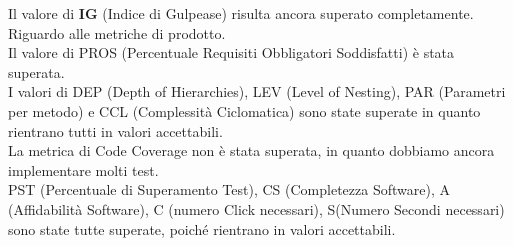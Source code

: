 Il valore di \textbf{IG} (Indice di Gulpease) risulta ancora superato completamente.\\
Riguardo alle metriche di prodotto.\\
Il valore di PROS (Percentuale Requisiti Obbligatori Soddisfatti) è stata superata.\\I valori di DEP (Depth of Hierarchies), LEV (Level of Nesting), PAR (Parametri per metodo) e CCL (Complessità Ciclomatica) sono state superate in quanto rientrano tutti in valori accettabili.\\La metrica di Code Coverage non è stata superata, in quanto dobbiamo ancora implementare molti test.\\PST (Percentuale di Superamento Test), CS (Completezza Software), A (Affidabilità Software), C (numero Click necessari), S(Numero Secondi necessari) sono state tutte superate, poiché rientrano in valori accettabili.
